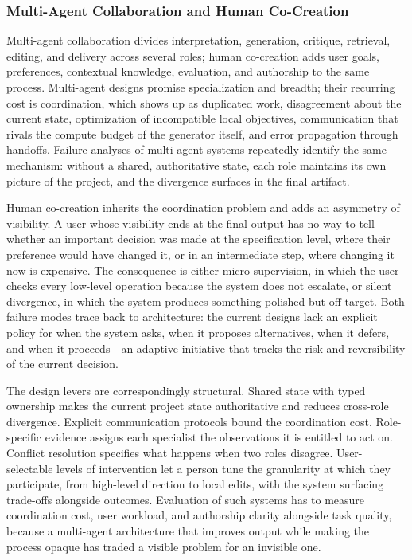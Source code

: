 \subsubsection{Multi-Agent Collaboration and Human Co-Creation}

Multi-agent collaboration divides interpretation, generation, critique, retrieval, editing, and delivery across several roles; human co-creation adds user goals, preferences, contextual knowledge, evaluation, and authorship to the same process. Multi-agent designs promise specialization and breadth; their recurring cost is coordination, which shows up as duplicated work, disagreement about the current state, optimization of incompatible local objectives, communication that rivals the compute budget of the generator itself, and error propagation through handoffs. Failure analyses of multi-agent systems repeatedly identify the same mechanism: without a shared, authoritative state, each role maintains its own picture of the project, and the divergence surfaces in the final artifact.

Human co-creation inherits the coordination problem and adds an asymmetry of visibility. A user whose visibility ends at the final output has no way to tell whether an important decision was made at the specification level, where their preference would have changed it, or in an intermediate step, where changing it now is expensive. The consequence is either micro-supervision, in which the user checks every low-level operation because the system does not escalate, or silent divergence, in which the system produces something polished but off-target. Both failure modes trace back to architecture: the current designs lack an explicit policy for when the system asks, when it proposes alternatives, when it defers, and when it proceeds---an adaptive initiative that tracks the risk and reversibility of the current decision.

The design levers are correspondingly structural. Shared state with typed ownership makes the current project state authoritative and reduces cross-role divergence. Explicit communication protocols bound the coordination cost. Role-specific evidence assigns each specialist the observations it is entitled to act on. Conflict resolution specifies what happens when two roles disagree. User-selectable levels of intervention let a person tune the granularity at which they participate, from high-level direction to local edits, with the system surfacing trade-offs alongside outcomes. Evaluation of such systems has to measure coordination cost, user workload, and authorship clarity alongside task quality, because a multi-agent architecture that improves output while making the process opaque has traded a visible problem for an invisible one.

